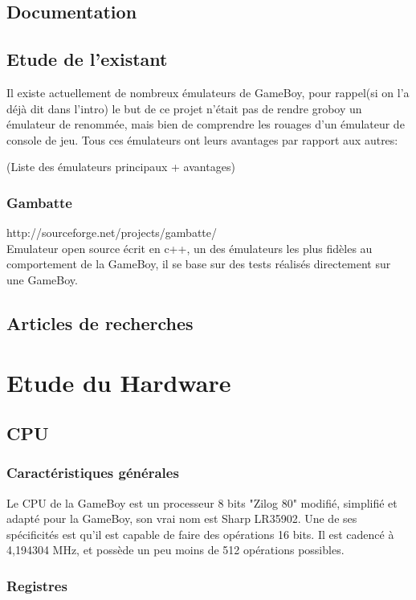 \documentclass{report}
\begin{document}
\section{Documentation}
\section{Etude de l'existant}
Il existe actuellement de nombreux émulateurs de GameBoy, pour rappel(si on l'a déjà dit dans l'intro) le but de ce projet n'était pas de rendre groboy un émulateur de renommée, mais bien de comprendre les rouages d'un émulateur de console de jeu.
Tous ces émulateurs ont leurs avantages par rapport aux autres:

(Liste des émulateurs principaux + avantages)
\subsection{Gambatte}
http://sourceforge.net/projects/gambatte/\\
Emulateur open source écrit en c++, un des émulateurs les plus fidèles au comportement de la GameBoy, il se base sur des tests réalisés directement sur une GameBoy.
\section{Articles de recherches}

\chapter{Etude du Hardware}
\section{CPU}
\subsection{Caractéristiques générales}
Le CPU de la GameBoy est un processeur 8 bits "Zilog 80" modifié, simplifié et adapté pour la GameBoy, son vrai nom est Sharp LR35902.
Une de ses spécificités est qu'il est capable de faire des opérations 16 bits.
Il est cadencé à 4,194304 MHz, et possède un peu moins de 512 opérations possibles.
\subsection{Registres}
\end{document}
